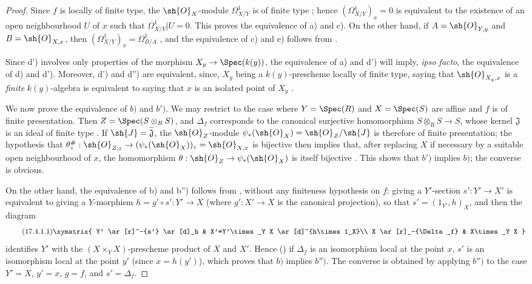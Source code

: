 \begin{proof}
Since $f$ is locally of finite type, the $\sh{O}_X$-module $\Omega^1_{X/Y}$ is of finite type ; hence $(\Omega^1_{X/Y})_x=0$ is equivalent to the existence of an open neighbourhood $U$ of $x$ such that $\Omega^1_{X/Y}|U=0$.
This proves the equivalence of a) and c).
On the other hand, if $A=\sh{O}_{Y,y}$ and $B=\sh{O}_{X,x}$, then $(\Omega^1_{X/Y})_x=\Omega^1_{B/A}$ , and the equivalence of c) and e) follows from .

Since d') involves only properties of the morphism $X_y\to\Spec(k(y))$, the equivalence of a) and d') will imply, \emph{ipso facto}, the equivalence of d) and d').
Moreover, d') and d'') are equivalent, since, $X_y$ being a $k(y)$-prescheme locally of finite type, saying that $\sh{O}_{X_y,x}$ is a \emph{finite} $k(y)$-algebra is equivalent to saying that $x$ is an isolated point of $X_y$ .

We now prove the equivalence of $b)$ and $b')$.
We may restrict to the case where $Y=\Spec(R)$ and $X=\Spec(S)$ are affine and $f$ is of finite presentation. Then $Z=\Spec(S\otimes_R S)$, and $\Delta_f$ corresponds to the canonical surjective homomorphism $S\otimes_R S\to S$, whose kernel $\mathfrak{J}$ is an ideal of finite type . If $\sh{J}=\widetilde{\mathfrak{J}}$, the $\sh{O}_Z$-module $\psi_*(\sh{O}_X)=\sh{O}_Z/\sh{J}$ is therefore of finite presentation; the hypothesis that $\theta_z^\#:\sh{O}_{Z,z}\to(\psi_*(\sh{O}_X))_z=\sh{O}_{X,x}$ is bijective then implies that, after replacing $X$ if necessary by a suitable open neighbourhood of $x$, the homomorphism $\theta:\sh{O}_Z\to\psi_*(\sh{O}_X)$ is itself bijective .
This shows that $b')$ implies $b)$; the converse is obvious.

On the other hand, the equivalence of b) and b'') follows from , without any finiteness hypothesis on $f$: giving a $Y'$-section $s':Y'\to X'$ is equivalent to giving a
$Y$-morphism $h=g'\circ s':Y'\to X$ (where $g':X'\to X$ is the canonical projection), so that $s'=(1_{Y'},h)_X$, and then the diagram
\[
\tag{17.4.1.1}
\xymatrix{
Y' \ar[r]^-{s'} \ar[d]_h & X'=Y'\times_Y X \ar[d]^{h\times 1_X}\\
X \ar[r]_-{\Delta_f} & X\times_Y X
}
\]
identifies $Y'$ with the $(X\times_Y X)$-prescheme product of $X$ and $X'$.
Hence () if $\Delta_f$ is an isomorphism local at the point $x$, $s'$ is an isomorphism local at the point $y'$ (since $x=h(y')$), which proves that $b)$ implies $b'')$.
The converse is obtained by applying $b'')$ to the case $Y'=X$, $y'=x$, $g=f$, and $s'=\Delta_f$.


\end{proof}
